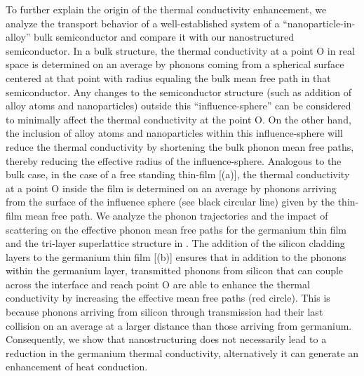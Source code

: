 \par To further explain the origin of the thermal conductivity enhancement, we analyze the transport behavior of a well-established system of a “nanoparticle-in-alloy” bulk semiconductor \cite{RN98,RN29} and compare it with our nanostructured semiconductor. In a bulk structure, the thermal conductivity at a point O in real space is determined on an average by phonons coming from a spherical surface centered at that point with radius equaling the bulk mean free path in that semiconductor. Any changes to the semiconductor structure (such as addition of alloy atoms and nanoparticles) outside this “influence-sphere” can be considered to minimally affect the thermal conductivity at the point O. On the other hand, the inclusion of alloy atoms and nanoparticles within this influence-sphere will reduce the thermal conductivity by shortening the bulk phonon mean free paths, thereby reducing the effective radius of the influence-sphere. Analogous to the bulk case, in the case of a free standing thin-film [(a)], the thermal conductivity at a point O inside the film is determined on an average by phonons arriving from the surface of the influence sphere (see black circular line) given by the thin-film mean free path. We analyze the phonon trajectories and the impact of scattering on the effective phonon mean free paths for the germanium thin film and the tri-layer superlattice structure in . The addition of the silicon cladding layers to the germanium thin film [(b)] ensures that in addition to the phonons within the germanium layer, transmitted phonons from silicon that can couple across the interface and reach point O are able to enhance the thermal conductivity by increasing the effective mean free paths (red circle). This is because phonons arriving from silicon through transmission had their last collision on an average at a larger distance than those arriving from germanium. Consequently, we show that nanostructuring does not necessarily lead to a reduction in the germanium thermal conductivity, alternatively it can generate an enhancement of heat conduction.
